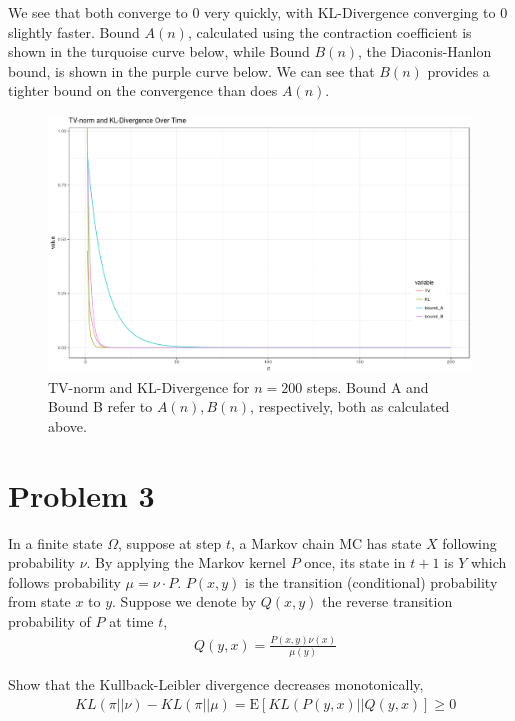 \documentclass[5pt]{article}
\newcommand{\E}{\mathrm{E}}
\begin{document}
We see that both converge to 0 very quickly, with KL-Divergence converging to 0 slightly faster. Bound $A(n)$, calculated using the contraction coefficient is shown in the turquoise curve below, while Bound $B(n)$, the Diaconis-Hanlon bound, is shown in the purple curve below. We can see that $B(n)$ provides a tighter bound on the convergence than does $A(n)$. \\

\begin{figure}[H]
\begin{center}
\includegraphics[width = 0.9\columnwidth]{q2_plot}
\caption{TV-norm and KL-Divergence for $n = 200$ steps. Bound A and Bound B refer to $A(n), B(n)$, respectively, both as calculated above.}
\end{center}
\end{figure}



\pagebreak


\section{Problem 3}
In a finite state $\Omega$, suppose at step $t$, a Markov chain MC has state $X$ following probability $\nu$. By applying the Markov kernel $P$ once, its state in $t+1$ is $Y$ which follows probability $\mu = \nu \cdot P$. $P(x,y)$ is the transition (conditional) probability from state $x$ to $y$. Suppose we denote by $Q(x,y)$ the reverse transition probability of $P$ at time $t$, 
\begin{align}
	& Q(y,x) = \frac{P(x,y) \nu(x)}{\mu(y)}
\end{align}

Show that the Kullback-Leibler divergence decreases monotonically,
\begin{align}
	& KL \left( \pi || \nu \right) - KL \left( \pi || \mu \right) = \E\left[
	KL \left( P \left( y, x \right) || Q\left( y, x \right) \right] \geq 0
\end{align}
\end{document}
